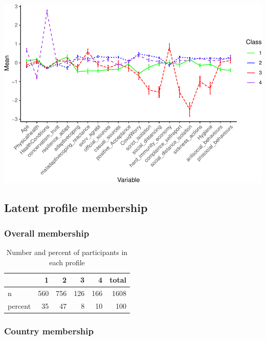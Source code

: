 \documentclass[]{article}
\begin{document}
\includegraphics{lpa_analyses_files/figure-latex/unnamed-chunk-15-1.pdf}

\hypertarget{latent-profile-membership-2}{%
\subsection{Latent profile
membership}\label{latent-profile-membership-2}}

\hypertarget{overall-membership-2}{%
\subsubsection{Overall membership}\label{overall-membership-2}}

\begin{table}[H]

\caption{\label{tab:unnamed-chunk-16}Number and percent of participants in each profile}
\centering
\fontsize{6}{8}\selectfont
\begin{tabular}[t]{lrrrrr}
\toprule
  & 1 & 2 & 3 & 4 & total\\
\midrule
n & 560 & 756 & 126 & 166 & 1608\\
percent & 35 & 47 & 8 & 10 & 100\\
\bottomrule
\end{tabular}
\end{table}

\hypertarget{country-membership-2}{%
\subsubsection{Country membership}\label{country-membership-2}}
\end{document}
